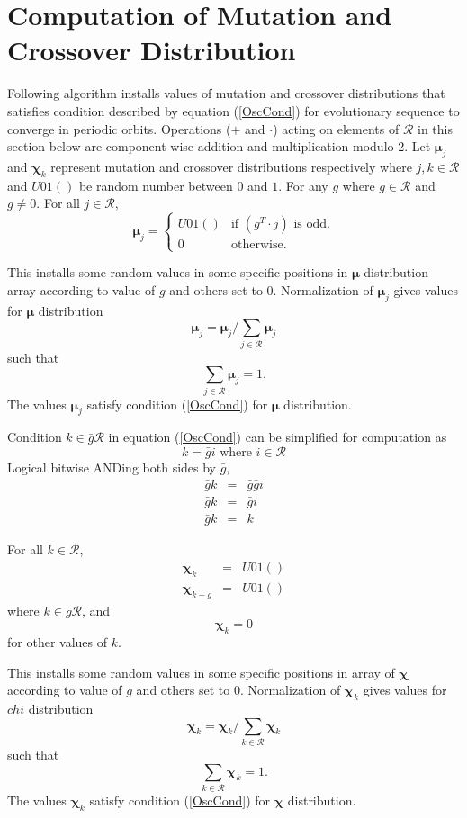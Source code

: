 \section{Computation of Mutation and Crossover Distribution}
Following algorithm installs values of mutation and crossover distributions that satisfies condition described 
by equation (\ref{OscCond}) for evolutionary sequence to converge in periodic orbits. Operations ($+$ and $\cdot$) acting on elements of $\mathcal{R}$ in this section below are component-wise addition and multiplication modulo 2. 
Let $\bm{\mu}_j$ and $\bm{\chi}_k$ represent mutation and crossover distributions respectively where $j,k \in \mathcal{R}$ 
and $U01()$ be random number between $0$ and $1$. For any $g$ where $g \in \mathcal{R}$ and $g \neq 0$.
For all $j \in \mathcal{R}$,
\[
\bm{\mu}_j = \begin{cases}
    U01() & \text{if $(g^T\cdot j)$ is odd}.\\
    0 & \text{otherwise}.
  \end{cases}
\]

This installs some random values in some specific positions in $\bm{\mu}$ distribution array according to value of $g$ and others set to $0$. 
Normalization of $\bm{\mu}_j$ gives values for $\bm{\mu}$ distribution
\[
\bm{\mu}_j = \bm{\mu}_j / \sum \limits_{j \in \mathcal{R} } \bm{\mu}_j
\]
such that 
\[
\sum \limits_{j \in \mathcal{R} } \bm{\mu}_j = 1.
\]
The values $\bm{\mu}_j$ satisfy condition (\ref{OscCond}) for $\bm{\mu}$ distribution.


Condition $k \in \bar{g} \mathcal{R}$ in equation (\ref{OscCond}) can be simplified for computation as
\[
k = \bar{g} i  \text{ where $i \in \mathcal{R}$}
\]
Logical bitwise ANDing both sides by $\bar{g}$,
\begin{eqnarray*}
\bar{g} k & = & \bar{g} \bar{g} i \\
\bar{g} k & = & \bar{g} i \\
\bar{g} k & = & k 
\end{eqnarray*}

For all $k \in \mathcal{R}$,
\begin{eqnarray*}
\bm{\chi}_k & = & U01() \\
\bm{\chi}_{k+g} & = & U01() 
\end{eqnarray*}
where $k \in \bar{g} \mathcal{R}$, and
\[
\bm{\chi}_k = 0
\]
for other values of $k$. \newline

This installs some random values in some specific positions in array of $\bm{\chi}$ according to value of $g$ 
and others set to $0$. Normalization of $\bm{\chi}_k$ gives values for $chi$ distribution 
\[
\bm{\chi}_k = \bm{\chi}_k/\sum\limits_{k \in \mathcal{R}} \bm{\chi}_k
\]
such that 
\[
\sum\limits_{k \in \mathcal{R}} \bm{\chi}_k = 1.
\]
The values $\bm{\chi}_k$ satisfy condition (\ref{OscCond}) for $\bm{\chi}$ distribution.

